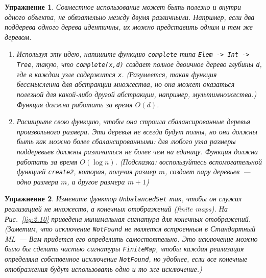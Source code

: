 \documentclass[aspectratio=169
  , xcolor={svgnames}
  , hyperref={ colorlinks,citecolor=DeepPink4
             , linkcolor=DarkRed,urlcolor=DarkBlue}
  , russian
  ]{beamer}
\newcommand{\term}[2]{\textit{#1} (#2)}
\theoremstyle{exerciseStyle1}
\newtheorem{exercise}{\textbf{Упражнение}}[section]
\begin{document}
\begin{frame}
\begin{exercise}\label{ex:2.5}
  Совместное использование может быть полезно и внутри одного объекта, не
  обязательно между двумя различными.  Например, если два поддерева
  одного дерева идентичны, их можно представить одним и тем же
  деревом.
  \begin{enumerate}
    \item Используя эту идею, напишите функцию \lstinline{complete} типа
    \texttt{Elem -> Int -> Tree}, такую, что
    \texttt{complete(x,d)} создает полное двоичное дерево глубины
    \lstinline{d}, где в каждом узле содержится \lstinline{x}.
    (Разумеется, такая функция бессмысленна для абстракции множества,
    но она может оказаться полезной для какой-либо другой абстракции,
    например, мультимножества.) Функция должна работать за время $O(d)$.
    \item Расширьте свою функцию, чтобы она строила сбалансированные
    деревья произвольного размера. Эти деревья не всегда будут полны,
    но они должны быть как можно более сбалансированными: для любого
    узла размеры поддеревьев должны различаться не более чем на
    единицу. Функция должна работать за время $O(\log n)$. (Подсказка:
    воспользуйтесь вспомогательной функцией \lstinline{create2},
    которая, получая размер $m$, создает пару деревьев~--- одно размера
    $m$, а другое размера $m+1$)
  \end{enumerate}
\end{exercise}
\end{frame}

\begin{frame}
\begin{exercise}\label{ex:2.6}
  Измените функтор \texttt{UnbalancedSet} так, чтобы он служил
  реализацией не множеств, а \term{конечных отображений}{finite maps}. На
  Рис.~\ref{fig:2.10} приведена минимальная сигнатура для конечных
  отображений. (Заметим, что исключение \texttt{NotFound} не
  является встроенным в Стандартный ML~--- Вам придется его определить
  самостоятельно. Это исключение можно было бы сделать частью
  сигнатуры \texttt{FiniteMap},  чтобы каждая реализация
  определяла собственное исключение \texttt{NotFound}, но удобнее,
  если все конечные отображения будут использовать одно и то же
  исключение.)
\end{exercise}

\end{frame}
\end{document}
